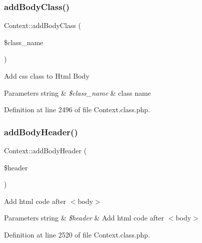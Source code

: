 \mbox{\label{classContext_ad266c6556167746e9368c4b1a7f6b16b}} 
\subsubsection{\texorpdfstring{add\+Body\+Class()}{addBodyClass()}}
{\footnotesize\ttfamily Context\+::add\+Body\+Class (\begin{DoxyParamCaption}\item[{}]{\$class\+\_\+name }\end{DoxyParamCaption})}

Add css class to Html Body


\begin{DoxyParams}[1]{Parameters}
string & {\em \$class\+\_\+name} & class name \\
\hline
\end{DoxyParams}


Definition at line 2496 of file Context.\+class.\+php.

\mbox{\label{classContext_ae7c9dad9ccd3e410283e21c67f395114}} 
\subsubsection{\texorpdfstring{add\+Body\+Header()}{addBodyHeader()}}
{\footnotesize\ttfamily Context\+::add\+Body\+Header (\begin{DoxyParamCaption}\item[{}]{\$header }\end{DoxyParamCaption})}

Add html code after $<$body$>$


\begin{DoxyParams}[1]{Parameters}
string & {\em \$header} & Add html code after $<$body$>$ \\
\hline
\end{DoxyParams}


Definition at line 2520 of file Context.\+class.\+php.

\mbox{\label{classContext_ac08df39b79aca5d52cc5d45adba5d3a6}} 
